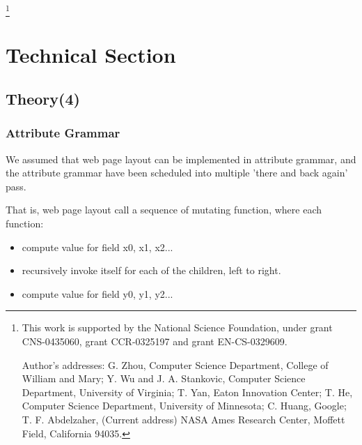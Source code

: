 \documentclass[format=acmsmall, review=false, screen=true]{acmart}
\begin{document}

%
%




\thanks{This work is supported by the National Science Foundation,
  under grant CNS-0435060, grant CCR-0325197 and grant EN-CS-0329609.

  Author's addresses: G. Zhou, Computer Science Department, College of
  William and Mary; Y. Wu {and} J. A. Stankovic, Computer Science
  Department, University of Virginia; T. Yan, Eaton Innovation Center;
  T. He, Computer Science Department, University of Minnesota; C.
  Huang, Google; T. F. Abdelzaher, (Current address) NASA Ames
  Research Center, Moffett Field, California 94035.}


\maketitle

\renewcommand{\shortauthors}{G. Zhou et al.}

\section{Technical Section}

\subsection{Theory(4)}

\subsubsection{Attribute Grammar}
We assumed that web page layout can be implemented in attribute grammar, and the attribute grammar have been scheduled into multiple 'there and back again' pass.

That is, web page layout call a sequence of mutating function, where each function:
\begin{itemize}
	\item compute value for field x0, x1, x2...
	\item recursively invoke itself for each of the children, left to right.
	\item compute value for field y0, y1, y2...
\end{itemize}
\end{document}
